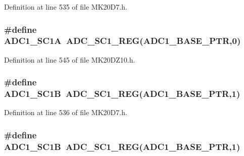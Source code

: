 Definition at line 535 of file M\+K20\+D7.\+h.

\subsubsection[{\texorpdfstring{A\+D\+C1\+\_\+\+S\+C1A}{ADC1_SC1A}}]{\setlength{\rightskip}{0pt plus 5cm}\#define A\+D\+C1\+\_\+\+S\+C1A~{\bf A\+D\+C\+\_\+\+S\+C1\+\_\+\+R\+EG}({\bf A\+D\+C1\+\_\+\+B\+A\+S\+E\+\_\+\+P\+TR},0)}\hypertarget{group___a_d_c___register___accessor___macros_ga16eb376382e576f0b2995436e27bb7f7}{}\label{group___a_d_c___register___accessor___macros_ga16eb376382e576f0b2995436e27bb7f7}


Definition at line 545 of file M\+K20\+D\+Z10.\+h.

\subsubsection[{\texorpdfstring{A\+D\+C1\+\_\+\+S\+C1B}{ADC1_SC1B}}]{\setlength{\rightskip}{0pt plus 5cm}\#define A\+D\+C1\+\_\+\+S\+C1B~{\bf A\+D\+C\+\_\+\+S\+C1\+\_\+\+R\+EG}({\bf A\+D\+C1\+\_\+\+B\+A\+S\+E\+\_\+\+P\+TR},1)}\hypertarget{group___a_d_c___register___accessor___macros_ga1fd03625d4b519c97a65336bba6cb512}{}\label{group___a_d_c___register___accessor___macros_ga1fd03625d4b519c97a65336bba6cb512}


Definition at line 536 of file M\+K20\+D7.\+h.

\subsubsection[{\texorpdfstring{A\+D\+C1\+\_\+\+S\+C1B}{ADC1_SC1B}}]{\setlength{\rightskip}{0pt plus 5cm}\#define A\+D\+C1\+\_\+\+S\+C1B~{\bf A\+D\+C\+\_\+\+S\+C1\+\_\+\+R\+EG}({\bf A\+D\+C1\+\_\+\+B\+A\+S\+E\+\_\+\+P\+TR},1)}\hypertarget{group___a_d_c___register___accessor___macros_ga1fd03625d4b519c97a65336bba6cb512}{}\label{group___a_d_c___register___accessor___macros_ga1fd03625d4b519c97a65336bba6cb512}



